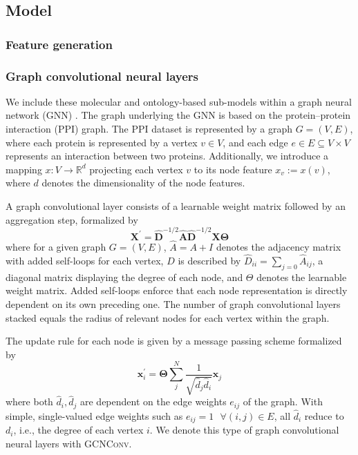 \documentclass[]{article}
\renewcommand{\cite}{\citep}
\begin{document}
\subsection{Model}

\subsubsection{Feature generation}

\subsubsection{Graph convolutional neural layers}

We include these molecular and ontology-based sub-models within a
graph neural network (GNN) \cite{GCNConv}. The graph underlying the GNN is
based on the protein--protein interaction (PPI) graph. The PPI dataset
is represented by a graph $G=(V,E)$, where each protein is represented
by a vertex $v\in V$, and each edge $e\in E\subseteq V\times V$
represents an interaction between two proteins. Additionally, we
introduce a mapping $x:V\rightarrow\mathbb{R}^{d}$ projecting each
vertex $v$ to its node feature $x_v := x(v)$, where $d$ denotes the
dimensionality of the node features.

A graph convolutional layer \cite{GCNConv} consists of a learnable
weight matrix followed by an aggregation step, formalized by
\begin{equation}
	\mathbf{X}^{\prime} = \mathbf{\hat{D}}^{-1/2} \mathbf{\hat{A}}
	\mathbf{\hat{D}}^{-1/2} \mathbf{X} \mathbf{\Theta}
\end{equation}
where for a given graph $G=(V,E)$, $\hat{A} = A + I$ denotes the
adjacency matrix with added self-loops for each vertex, $D$ is
described by $\hat{D}_{ii} = \sum_{j=0} \hat{A}_{ij}$, a diagonal
matrix displaying the degree of each node, and $\Theta$ denotes the
learnable weight matrix. Added self-loops enforce that each node
representation is directly dependent on its own preceding one. The
number of graph convolutional layers stacked equals the radius of
relevant nodes for each vertex within the graph.

The update rule for each node is given by a message passing scheme
formalized by
\begin{equation}
	\mathbf{x}^{\prime}_i = \mathbf{\Theta} \sum^{N}_{j}
	\frac{1}{\sqrt{\hat{d}_j \hat{d}_i}} \mathbf{x}_j
\end{equation}
where both $\hat{d}_i, \hat{d}_j$ are dependent on the edge weights
$e_{ij}$ of the graph. With simple, single-valued edge weights such as
$e_{ij}=1 \text{ }\forall (i,j)\in E$, all $\hat{d}_i$ reduce to
$d_i$, i.e., the degree of each vertex $i$. We denote this type of
graph convolutional neural layers with \textsc{GCNConv}.
\end{document}

